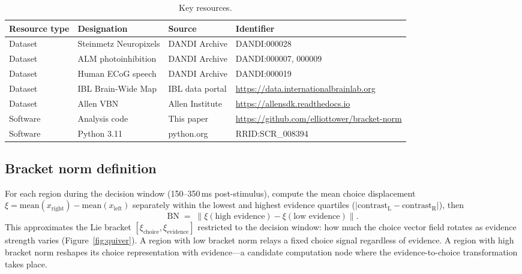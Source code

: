 \documentclass[9pt,lineno]{elife}
\begin{document}
\begin{table}[t]
\centering
\caption{Key resources.}
\label{tab:key_resources}
\small
\begin{tabular}{p{2.8cm}p{3.2cm}p{2.5cm}p{3.5cm}}
\toprule
\textbf{Resource type} & \textbf{Designation} & \textbf{Source} & \textbf{Identifier} \\
\midrule
Dataset & Steinmetz Neuropixels & DANDI Archive & DANDI:000028 \\
Dataset & ALM photoinhibition & DANDI Archive & DANDI:000007, 000009 \\
Dataset & Human ECoG speech & DANDI Archive & DANDI:000019 \\
Dataset & IBL Brain-Wide Map & IBL data portal & \url{https://data.internationalbrainlab.org} \\
Dataset & Allen VBN & Allen Institute & \url{https://allensdk.readthedocs.io} \\
Software & Analysis code & This paper & \url{https://github.com/elliottower/bracket-norm} \\
Software & Python 3.11 & python.org & RRID:SCR\_008394 \\
\bottomrule
\end{tabular}
\end{table}

\subsection{Bracket norm definition}
\label{sec:bn_def}

For each region during the decision window (150--350\,ms post-stimulus), compute the mean choice displacement $\xi = \text{mean}(x_{\text{right}}) - \text{mean}(x_{\text{left}})$ separately within the lowest and highest evidence quartiles ($|\text{contrast}_{\text{L}} - \text{contrast}_{\text{R}}|$), then
\begin{equation}
\text{BN} \;=\; \bigl\lVert \xi(\text{high evidence}) - \xi(\text{low evidence}) \bigr\rVert .
\end{equation}
This approximates the Lie bracket $[\xi_{\text{choice}}, \xi_{\text{evidence}}]$ restricted to the decision window: how much the choice vector field rotates as evidence strength varies (Figure~\ref{fig:quiver}). A region with low bracket norm relays a fixed choice signal regardless of evidence. A region with high bracket norm reshapes its choice representation with evidence---a candidate computation node where the evidence-to-choice transformation takes place.
\end{document}
